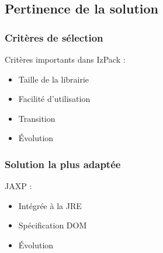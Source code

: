 \subsection{Pertinence de la solution}
\begin{frame}\frametitle{Critères de sélection}
Critères importants dans IzPack :
\begin{itemize}
	\item Taille de la librairie
	\item Facilité d'utilisation
	\item Transition
	\item Évolution
\end{itemize}
\end{frame}
\begin{frame}\frametitle{Solution la plus adaptée}
JAXP :
\begin{itemize}
	\item Intégrée à la JRE
	\item Spécification DOM
	\item Évolution
\end{itemize}
\end{frame}
